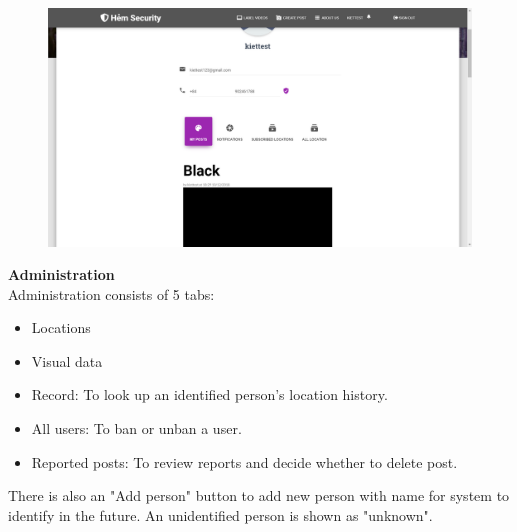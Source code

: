 \begin{figure}[!htb]
\endminipage\hfill
{}
  \includegraphics[width=\linewidth]{images/chap4/profile.png}
\endminipage
\end{figure}
\cleardoublepage
\textbf{Administration}
\\
Administration consists of 5 tabs:
\begin{itemize}
\item Locations
\item Visual data
\item Record: To look up an identified person's location history.
\item All users: To ban or unban a user.
\item Reported posts: To review reports and decide whether to delete post.
\end{itemize}
There is also an "Add person" button to add new person with name for system to identify in the future. An unidentified person is shown as "unknown".
